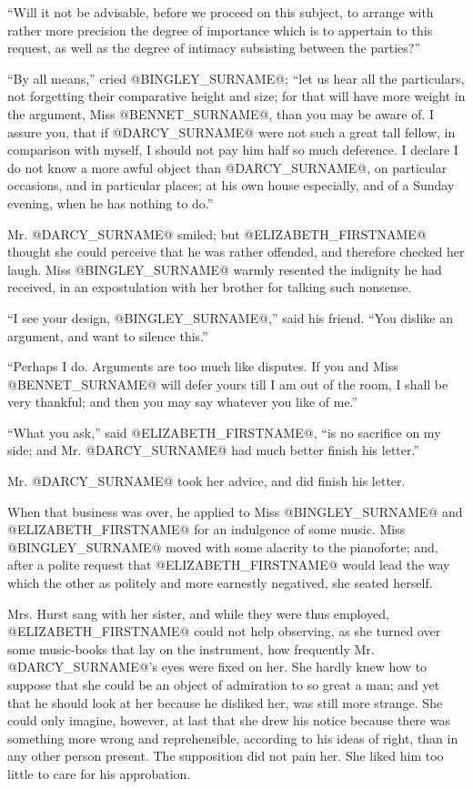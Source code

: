 ``Will it not be advisable, before we proceed on this subject, to
arrange with rather more precision the degree of importance which is to
appertain to this request, as well as the degree of intimacy subsisting
between the parties?''

``By all means,'' cried @BINGLEY_SURNAME@; ``let us hear all the particulars, not
forgetting their comparative height and size; for that will have more
weight in the argument, Miss @BENNET_SURNAME@, than you may be aware of. I assure
you, that if @DARCY_SURNAME@ were not such a great tall fellow, in comparison with
myself, I should not pay him half so much deference. I declare I do not
know a more awful object than @DARCY_SURNAME@, on particular occasions, and in
particular places; at his own house especially, and of a Sunday evening,
when he has nothing to do.''

Mr. @DARCY_SURNAME@ smiled; but @ELIZABETH_FIRSTNAME@ thought she could perceive that he was
rather offended, and therefore checked her laugh. Miss @BINGLEY_SURNAME@ warmly
resented the indignity he had received, in an expostulation with her
brother for talking such nonsense.

``I see your design, @BINGLEY_SURNAME@,'' said his friend. ``You dislike an argument,
and want to silence this.''

``Perhaps I do. Arguments are too much like disputes. If you and Miss
@BENNET_SURNAME@ will defer yours till I am out of the room, I shall be very
thankful; and then you may say whatever you like of me.''

``What you ask,'' said @ELIZABETH_FIRSTNAME@, ``is no sacrifice on my side; and Mr.
@DARCY_SURNAME@ had much better finish his letter.''

Mr. @DARCY_SURNAME@ took her advice, and did finish his letter.

When that business was over, he applied to Miss @BINGLEY_SURNAME@ and @ELIZABETH_FIRSTNAME@
for an indulgence of some music. Miss @BINGLEY_SURNAME@ moved with some alacrity
to the pianoforte; and, after a polite request that @ELIZABETH_FIRSTNAME@ would lead
the way which the other as politely and more earnestly negatived, she
seated herself.

Mrs. Hurst sang with her sister, and while they were thus employed,
@ELIZABETH_FIRSTNAME@ could not help observing, as she turned over some music-books
that lay on the instrument, how frequently Mr. @DARCY_SURNAME@'s eyes were fixed
on her. She hardly knew how to suppose that she could be an object of
admiration to so great a man; and yet that he should look at her
because he disliked her, was still more strange. She could only imagine,
however, at last that she drew his notice because there was something
more wrong and reprehensible, according to his ideas of right, than in
any other person present. The supposition did not pain her. She liked
him too little to care for his approbation.

